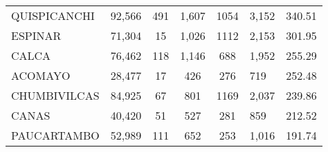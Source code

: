 \begin{tabular}{lrccclr}
	\cellcolor[HTML]{FFE699}QUISPICANCHI                           & 92,566                                                         & 491                                                         & 1,607                & 1054                     & 3,152                                                               & 340.51                                                                       \\
	\cellcolor[HTML]{FFE699}ESPINAR                                & 71,304                                                         & 15                                                          & 1,026                & 1112                     & 2,153                                                               & 301.95                                                                       \\
	\cellcolor[HTML]{FFE699}CALCA                                  & 76,462                                                         & 118                                                         & 1,146                & 688                      & 1,952                                                               & 255.29                                                                       \\
	\cellcolor[HTML]{FFE699}ACOMAYO                                & 28,477                                                         & 17                                                          & 426                  & 276                      & 719                                                                 & 252.48                                                                       \\
	\cellcolor[HTML]{FFE699}CHUMBIVILCAS                           & 84,925                                                         & 67                                                          & 801                  & 1169                     & 2,037                                                               & 239.86                                                                       \\
	\cellcolor[HTML]{C6E0B4}CANAS                                  & 40,420                                                         & 51                                                          & 527                  & 281                      & 859                                                                 & 212.52                                                                       \\
	\cellcolor[HTML]{C6E0B4}PAUCARTAMBO                            & 52,989                                                         & 111                                                         & 652                  & 253                      & 1,016                                                               & 191.74                                                                       \\

\end{tabular}
